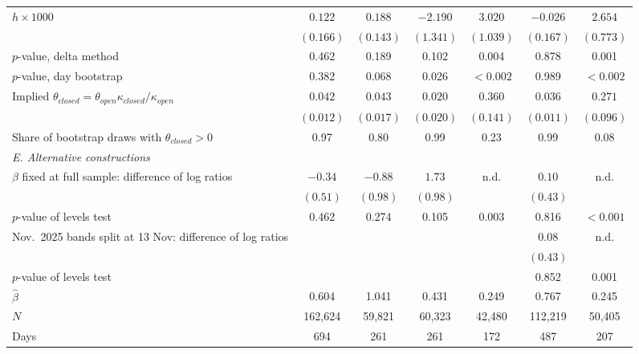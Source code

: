 \begin{tabular}{lcccccc}
$h\times1000$ & $0.122$ & $0.188$ & $-2.190$ & $3.020$ & $-0.026$ & $2.654$ \\
 & $(0.166)$ & $(0.143)$ & $(1.341)$ & $(1.039)$ & $(0.167)$ & $(0.773)$ \\
$p$-value, delta method & 0.462 & 0.189 & 0.102 & 0.004 & 0.878 & 0.001 \\
$p$-value, day bootstrap & 0.382 & 0.068 & 0.026 & $<0.002$ & 0.989 & $<0.002$ \\
Implied $\theta_{closed}=\theta_{open}\kappa_{closed}/\kappa_{open}$ & $0.042$ & $0.043$ & $0.020$ & $0.360$ & $0.036$ & $0.271$ \\
 & $(0.012)$ & $(0.017)$ & $(0.020)$ & $(0.141)$ & $(0.011)$ & $(0.096)$ \\
Share of bootstrap draws with $\theta_{closed}>0$ & 0.97 & 0.80 & 0.99 & 0.23 & 0.99 & 0.08 \\
\midrule
\multicolumn{7}{l}{\emph{E. Alternative constructions}} \\
$\beta$ fixed at full sample: difference of log ratios & $-0.34$ & $-0.88$ & $1.73$ & n.d. & $0.10$ & n.d. \\
 & $(0.51)$ & $(0.98)$ & $(0.98)$ &  & $(0.43)$ &  \\
\quad $p$-value of levels test & 0.462 & 0.274 & 0.105 & 0.003 & 0.816 & $<0.001$ \\
Nov.\ 2025 bands split at 13 Nov: difference of log ratios &  &  &  &  & $0.08$ & n.d. \\
 &  &  &  &  & $(0.43)$ &  \\
\quad $p$-value of levels test &  &  &  &  & 0.852 & 0.001 \\
\midrule
$\hat\beta$ & 0.604 & 1.041 & 0.431 & 0.249 & 0.767 & 0.245 \\
$N$ & 162,624 & 59,821 & 60,323 & 42,480 & 112,219 & 50,405 \\
Days & 694 & 261 & 261 & 172 & 487 & 207 \\
\bottomrule
\end{tabular}
